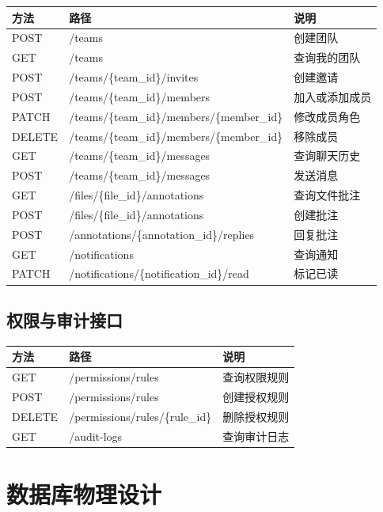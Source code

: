 \documentclass[a4paper,zihao=-4]{ctexart}
\begin{document}
\begin{longtable}{|>{\raggedright\arraybackslash}p{2.4cm}|>{\raggedright\arraybackslash}p{\dimexpr(\linewidth-2.4cm-6\tabcolsep-4\arrayrulewidth)/2\relax}|>{\raggedright\arraybackslash}p{\dimexpr(\linewidth-2.4cm-6\tabcolsep-4\arrayrulewidth)/2\relax}|}
\hline
方法 & 路径 & 说明\tabularnewline
\hline
\endhead
POST & /teams & 创建团队\tabularnewline
\hline
GET & /teams & 查询我的团队\tabularnewline
\hline
POST & /teams/\{team\_id\}/invites & 创建邀请\tabularnewline
\hline
POST & /teams/\{team\_id\}/members & 加入或添加成员\tabularnewline
\hline
PATCH & /teams/\{team\_id\}/members/\{member\_id\} & 修改成员角色\tabularnewline
\hline
DELETE & /teams/\{team\_id\}/members/\{member\_id\} & 移除成员\tabularnewline
\hline
GET & /teams/\{team\_id\}/messages & 查询聊天历史\tabularnewline
\hline
POST & /teams/\{team\_id\}/messages & 发送消息\tabularnewline
\hline
GET & /files/\{file\_id\}/annotations & 查询文件批注\tabularnewline
\hline
POST & /files/\{file\_id\}/annotations & 创建批注\tabularnewline
\hline
POST & /annotations/\{annotation\_id\}/replies & 回复批注\tabularnewline
\hline
GET & /notifications & 查询通知\tabularnewline
\hline
PATCH & /notifications/\{notification\_id\}/read & 标记已读\tabularnewline
\hline
\end{longtable}

\hypertarget{ux6743ux9650ux4e0eux5ba1ux8ba1ux63a5ux53e3}{%
\subsection{权限与审计接口}\label{ux6743ux9650ux4e0eux5ba1ux8ba1ux63a5ux53e3}}

\begin{longtable}{|>{\raggedright\arraybackslash}p{2.4cm}|>{\raggedright\arraybackslash}p{\dimexpr(\linewidth-2.4cm-6\tabcolsep-4\arrayrulewidth)/2\relax}|>{\raggedright\arraybackslash}p{\dimexpr(\linewidth-2.4cm-6\tabcolsep-4\arrayrulewidth)/2\relax}|}
\hline
方法 & 路径 & 说明\tabularnewline
\hline
\endhead
GET & /permissions/rules & 查询权限规则\tabularnewline
\hline
POST & /permissions/rules & 创建授权规则\tabularnewline
\hline
DELETE & /permissions/rules/\{rule\_id\} & 删除授权规则\tabularnewline
\hline
GET & /audit-logs & 查询审计日志\tabularnewline
\hline
\end{longtable}

\hypertarget{ux6570ux636eux5e93ux7269ux7406ux8bbeux8ba1}{%
\section{数据库物理设计}\label{ux6570ux636eux5e93ux7269ux7406ux8bbeux8ba1}}
\end{document}
